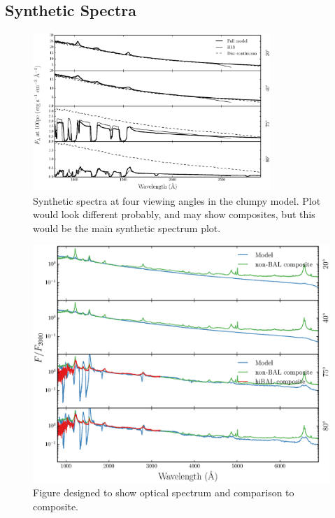 \documentclass[useAMS,usenatbib]{mn2e_x}
\begin{document}
\subsection{Synthetic Spectra}

\begin{figure} %
\centering
\includegraphics[width=0.8\textwidth]{figures/uvspec.eps}
\caption
{
Synthetic spectra at four viewing angles in the clumpy model. Plot would look different probably,
and may show composites, but this would be the main synthetic spectrum plot.
}
\label{fig:uvspec}
\end{figure} %

\begin{figure} %
\centering
\includegraphics[width=1.0\textwidth]{figures/opt.eps}
\caption
{
Figure designed to show optical spectrum and comparison to composite.
}
\label{fig:uvspec}
\end{figure} %
\end{document}
